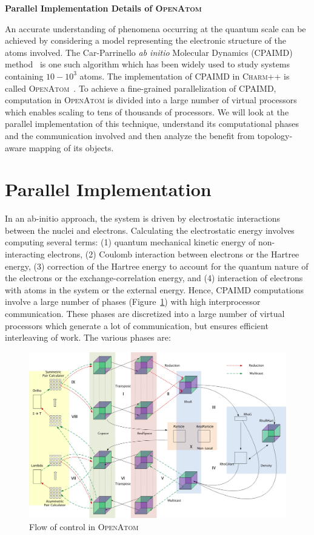 \documentclass[12pt,letter]{article}
\newcommand{\abTitle}[1]{\begin{center}\textbf{{\Large \bf #1}}\end{center}}
\newcommand{\charm}{\textsc{Charm++}}
\newcommand{\leancp}{\textsc{OpenAtom}}
\begin{document}
\abTitle{Parallel Implementation Details of \leancp}
\vspace{0.23in}

An accurate understanding of phenomena occurring at the quantum scale can be
achieved by considering a model representing the electronic structure of the 
atoms involved. The Car-Parrinello {\em ab initio} Molecular Dynamics (CPAIMD)
method~\cite{cpaimd,Galli1,Payne1,mark} is one such algorithm which has been 
widely used to study systems containing $10-10^3$ atoms. The implementation of
CPAIMD in \charm{} is called \leancp~\cite{CPAIMD-JCC-2005, LeanCPIBM07}. To
achieve a fine-grained parallelization of CPAIMD, computation in \leancp{} is 
divided into a large number of virtual processors which enables scaling to tens
of thousands of processors. We will look at the parallel implementation of this
technique, understand its computational phases and the communication involved
and then analyze the benefit from topology-aware mapping of its objects.

\section{Parallel Implementation}
In an ab-initio approach, the system is driven by electrostatic interactions
between the nuclei and electrons. Calculating the electrostatic energy involves
computing several terms: (1) quantum mechanical kinetic energy of 
non-interacting electrons, (2) Coulomb interaction between electrons or the 
Hartree energy, (3) correction of the Hartree energy to account for the quantum
nature of the electrons or the exchange-correlation energy, and (4) interaction
of electrons with atoms in the system or the external energy. Hence,
CPAIMD computations involve a large number of phases (Figure~\ref{fig:leancp})
with high interprocessor communication. These phases are discretized into a 
large number of virtual processors which generate a lot of communication, but
ensures efficient interleaving of work. The various phases are: 

\begin{figure}
\centering 
\includegraphics[width=5in]{OpenAtomDiagram} 
\caption{Flow of control in \leancp{}} 
\label{fig:leancp} 
\end{figure} 
\end{document}
